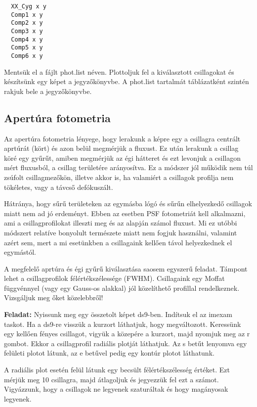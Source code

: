 \documentclass{article}
\begin{document}
\begin{verbatim}
  XX_Cyg x y
  Comp1 x y
  Comp2 x y
  Comp3 x y
  Comp4 x y
  Comp5 x y
  Comp6 x y
\end{verbatim}

Mentsük el a fájlt phot.list néven. Plottoljuk fel a kiválasztott csillagokat
és készítsünk egy képet a jegyzőkönyvbe. A phot.list tartalmát táblázatként
szintén rakjuk bele a jegyzőkönyvbe.

\subsection{Apertúra fotometria}

Az apertúra fotometria lényege, hogy lerakunk a képre egy a csillagra centrált
aprtúrát (kört) és azon belül megmérjük a fluxust. Ez után lerakunk a csillag
köré egy gyűrűt, amiben megmérjük az égi hátteret és ezt levonjuk a csillagon
mért fluxusból, a csillag területére arányosítva.
Ez a módszer jól működik nem túl zsúfolt csillagmezőkön, illetve akkor is, ha
valamiért a csillagok profilja nem tökéletes, vagy a távcső defókuszált.

Hátránya, hogy sűrű területeken az egymásba lógó és sűrűn elhelyezkedő
csillagok miatt nem ad jó erdeményt. Ebben az esetben PSF fotometriát kell
alkalmazni, ami a csillagprofilokat illeszti meg és az alapján számol fluxust.
Mi ez utóbbi módszert relatíve bonyolult természete miatt nem fogjuk használni,
valamint azért sem, mert a mi esetünkben a csillagaink kellően távol
helyezkednek el egymástól.

A megfelelő aprtúra és égi gyűrű kiválasztása saosem egyszerű feladat. Támpont
lehet a csillagprofilok félértékszélessége (FWHM). Csillagaink egy Moffat
függvénnyel (vagy egy Gauss-os alakkal) jól közelíthető profillal rendelkeznek.
Vizsgáljuk meg őket közelebbről!

{\bf Feladat:}
Nyissunk meg egy összetolt képet ds9-ben. Indítsuk el az imexam taskot.
Ha a ds9-re visszük a kurzort láthatjuk, hogy megváltozott. Keressünk egy
kellően fényes csillagot, vigyük a közepére a kurzort, majd nyomjuk meg az r
gombot. Ekkor a csillagprofil radiális plotját láthatjuk. Az s betűt lenyomva
egy felületi plotot látunk, az e betűvel pedig egy kontúr plotot láthatunk.

A radiális plot esetén felül látunk egy becsült félértékszélesség értéket.
Ezt mérjük meg 10 csillagra, majd átlagoljuk és jegyezzük fel ezt a számot.
Vigyázzunk, hogy a csillagok ne legyenek szaturáltak és hogy magányosak
legyenek.
\end{document}

